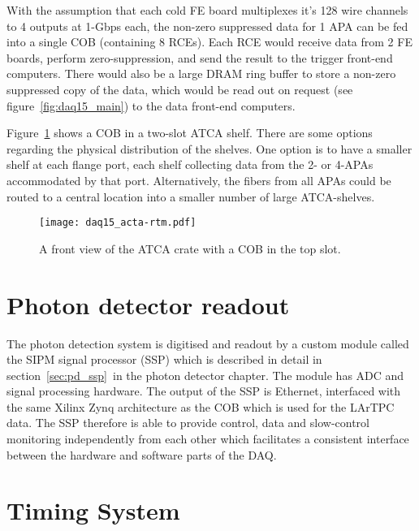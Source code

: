 With the assumption that each cold FE board multiplexes it's 128 wire
channels to 4 outputs at 1-Gbps each, the non-zero suppressed data for
1 APA can be fed into a single COB (containing 8 RCEs).  Each RCE
would receive data from 2 FE boards, perform zero-suppression, and
send the result to the trigger front-end computers.  There would also
be a large DRAM ring buffer to store a non-zero suppressed copy of the
data, which would be read out on request (see
figure~\ref{fig:daq15_main}) to the data front-end computers.

Figure~\ref{fig:daq15_atcapic} shows a COB in a two-slot ATCA shelf.
There are some options regarding the physical distribution of the
shelves.  One option is to have a smaller shelf at each flange port,
each shelf collecting data from the 2- or 4-APAs accommodated by that
port.  Alternatively, the fibers from all APAs could be routed to a
central location into a smaller number of large ATCA-shelves.

\begin{figure}[hbt]
  \texttt{[image: daq15\_acta-rtm.pdf]}
    \caption{\label{fig:daq15_atcapic}A front view of the ATCA crate with a COB in the top slot. }
\end{figure}

\section{Photon detector readout}
\label{sec:daq_ssp}

The photon detection system is digitised and readout by a custom
module called the SIPM signal processor (SSP) which is described in
detail in section~\ref{sec:pd_ssp}\ in the photon detector chapter.
The module has ADC and signal processing hardware.  The output of the
SSP is Ethernet, interfaced with the same Xilinx Zynq architecture as
the COB which is used for the LArTPC data. The SSP therefore is able
to provide control, data and slow-control monitoring independently
from each other which facilitates a consistent interface between the
hardware and software parts of the DAQ.

\section{Timing System }
\label{sec:daq_time}


